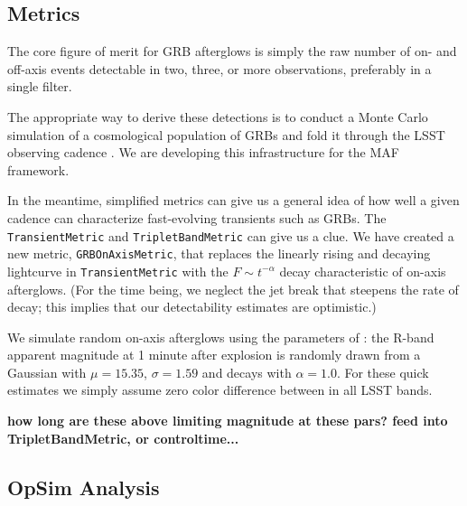 
\subsection{Metrics}
\label{sec:\secname:metrics}

The core figure of merit for GRB afterglows is simply the raw number of on- and off-axis events detectable in two, three, or more observations, preferably in a single filter.

The appropriate way to derive these detections is to conduct a Monte Carlo simulation of a cosmological population of GRBs and fold it through the LSST observing cadence \citep[cf.][]{2011PASP..123.1034J}.  We are developing this infrastructure for the MAF framework.  

In the meantime, simplified metrics can give us a general idea of how well a given cadence can characterize fast-evolving transients such as GRBs.
The \texttt{TransientMetric} and \texttt{TripletBandMetric} 
can give us a clue.  We have created a new metric, \texttt{GRBOnAxisMetric}, that replaces the linearly rising and decaying lightcurve in 
\texttt{TransientMetric} with the $F \sim t^{-\alpha}$ decay characteristic of on-axis afterglows.  (For the time being, we neglect the jet break that steepens the rate of decay; this implies that our detectability estimates are optimistic.)

We simulate random on-axis afterglows using the parameters of \citet{2011PASP..123.1034J}: the R-band apparent magnitude at 1 minute after explosion is randomly drawn from a Gaussian with $\mu=15.35$, $\sigma=1.59$ and decays with $\alpha=1.0$.  For these quick estimates we simply assume zero color difference between in all LSST bands.

\textbf{how long are these above limiting magnitude at these pars? feed into TripletBandMetric, or controltime...}



\subsection{OpSim Analysis}
\label{sec:\secname:analysis}

